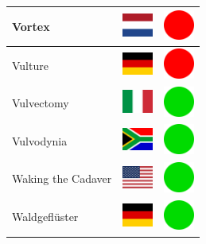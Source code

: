 \documentclass[12pt, a4paper, twoside]{report}
\begin{document}
\begin{center}
\begin{longtable}{|p{5cm}|p{2cm}|p{2cm}|}
 Vortex                                                     & \includegraphics[width=1cm]{../img/flags/nl} &   \includegraphics[width=1cm]{../likes/n} \\ \hline
 Vulture                                                    & \includegraphics[width=1cm]{../img/flags/de} &   \includegraphics[width=1cm]{../likes/n} \\ \hline
 Vulvectomy                                                 & \includegraphics[width=1cm]{../img/flags/it} &   \includegraphics[width=1cm]{../likes/y} \\ \hline
 Vulvodynia                                                 & \includegraphics[width=1cm]{../img/flags/za} &   \includegraphics[width=1cm]{../likes/y} \\ \hline
 Waking the Cadaver                                         & \includegraphics[width=1cm]{../img/flags/us} &   \includegraphics[width=1cm]{../likes/y} \\ \hline
 Waldgeflüster                                              & \includegraphics[width=1cm]{../img/flags/de} &   \includegraphics[width=1cm]{../likes/y} \\ \hline

\end{longtable}
\end{center}
\end{document}
